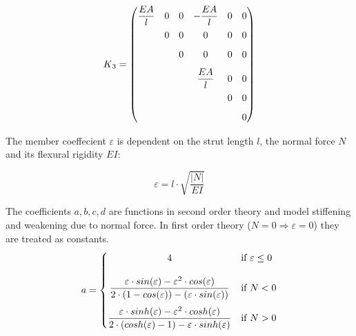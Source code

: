 \begin{equation} \label{K3}
K\textsubscript{3} = \begin{pmatrix}
\dfrac{EA}{l} & 0                   & 0                   & -\dfrac{EA}{l}  & 0                   & 0                   \\[0.8em]
              & 0                   & 0                   & 0               & 0                   & 0                   \\[0.8em]
              &                     & 0                   & 0               & 0                   & 0                   \\[0.8em]
              &                     &                     & \dfrac{EA}{l}   & 0                   & 0                   \\[0.8em]
              &                     &                     &                 & 0                   & 0                   \\[0.8em]
              &                     &                     &                 &                     & 0
     \end{pmatrix}
\end{equation}

The member coeffecient $\varepsilon$ is dependent on the strut length $l$, the normal force $N$ and its flexural rigidity $EI$:

\begin{equation} \label{e}
\varepsilon = l \cdot \sqrt{\frac{|N|}{EI}}
\end{equation}

The coefficients $a, b, c ,d$ are functions in second order theory and model stiffening and weakening due to normal force.
In first order theory ($N = 0 \Rightarrow \varepsilon = 0$) they are treated as constants.
\begin{equation} \label{a}
    a = \begin{cases}
            \hfil 4              & \text{if } \varepsilon \leq 0\\[1.2em]
            \hfil \dfrac{\varepsilon \cdot sin(\varepsilon) - \varepsilon^2 \cdot cos(\varepsilon)}{2 \cdot (1 - cos(\varepsilon)) - (\varepsilon \cdot sin(\varepsilon))}               & \text{if } N < 0          \\[1.2em]
            \dfrac{\varepsilon \cdot sinh(\varepsilon) - \varepsilon^2 \cdot cosh(\varepsilon)}{2 \cdot (cosh(\varepsilon) - 1) - \varepsilon \cdot sinh(\varepsilon)}               & \text{if } N > 0
        \end{cases}
\end{equation}

